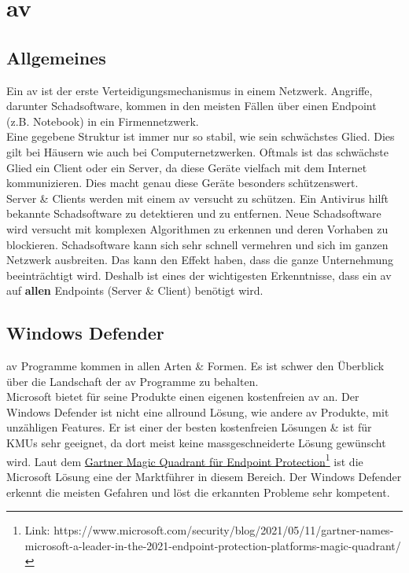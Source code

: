 \chapter{\acrlong{av}}
\section{Allgemeines}
Ein \acrfull{av} ist der erste Verteidigungsmechanismus in einem Netzwerk. Angriffe, darunter Schadsoftware, kommen in den meisten Fällen über einen Endpoint (z.B. Notebook) in ein Firmennetzwerk.\\

Eine gegebene Struktur ist immer nur so stabil, wie sein schwächstes Glied. Dies gilt bei Häusern wie auch bei Computernetzwerken.
Oftmals ist das schwächste Glied ein Client oder ein Server, da diese Geräte vielfach mit dem Internet kommunizieren.
Dies macht genau diese Geräte besonders schützenswert.\\

Server \& Clients werden mit einem \acrlong{av} versucht zu schützen. Ein Antivirus hilft bekannte Schadsoftware zu detektieren und zu entfernen.
Neue Schadsoftware wird versucht mit komplexen Algorithmen zu erkennen und deren Vorhaben zu blockieren.
Schadsoftware kann sich sehr schnell vermehren und sich im ganzen Netzwerk ausbreiten. 
Das kann den Effekt haben, dass die ganze Unternehmung beeinträchtigt wird.
Deshalb ist eines der wichtigesten Erkenntnisse, dass ein \acrlong{av} auf \textbf{allen} Endpoints (Server \& Client) benötigt wird.





\section{Windows Defender}
\acrfull{av} Programme kommen in allen Arten \& Formen.
Es ist schwer den Überblick über die Landschaft der \acrlong{av} Programme zu behalten.\\


Microsoft bietet für seine Produkte einen eigenen kostenfreien \acrlong{av} an.
Der Windows Defender ist nicht eine allround Lösung, wie andere \acrshort{av} Produkte, mit unzähligen Features.
Er ist einer der besten kostenfreien Lösungen \& ist für KMUs sehr geeignet, da dort meist keine massgeschneiderte Lösung gewünscht wird.
Laut dem \href{https://www.microsoft.com/security/blog/2021/05/11/gartner-names-microsoft-a-leader-in-the-2021-endpoint-protection-platforms-magic-quadrant/}{Gartner Magic Quadrant für Endpoint Protection}\footnote{Link: https://www.microsoft.com/security/blog/2021/05/11/gartner-names-microsoft-a-leader-in-the-2021-endpoint-protection-platforms-magic-quadrant/} ist die Microsoft Lösung eine der Marktführer in diesem Bereich.
Der Windows Defender erkennt die meisten Gefahren und löst die erkannten Probleme sehr kompetent.\\

